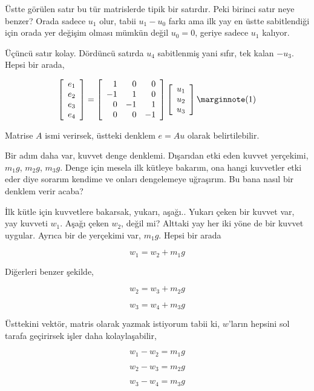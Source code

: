 \documentclass[12pt,fleqn]{article}\usepackage{../../common}
\begin{document}
Üstte görülen satır bu tür matrislerde tipik bir satırdır. Peki birinci
satır neye benzer? Orada sadece $u_1$ olur, tabii $u_1 - u_0$ farkı
ama ilk yay en üstte sabitlendiği için orada yer değişim olması mümkün
değil $u_0 = 0$, geriye sadece $u_1$ kalıyor.

Üçüncü satır kolay. Dördüncü satırda $u_4$ sabitlenmiş yani sıfır,
tek kalan $-u_3$. Hepsi bir arada,

$$
\left[\begin{array}{c}
e_1 \\ e_2 \\ e_3 \\ e_4
\end{array}\right] =
\left[\begin{array}{rrrr}
1 & 0 & 0 \\ -1 & 1 & 0 \\ 0 & -1 & 1 \\ 0 & 0 & -1
\end{array}\right]
\left[\begin{array}{c}
u_1 \\ u_2 \\ u_3 
\end{array}\right]
\mlabel{1}
$$

Matrise $A$ ismi verirsek, üstteki denklem $e = A u $ olarak belirtilebilir.

Bir adım daha var, kuvvet denge denklemi. Dışarıdan etki eden kuvvet yerçekimi,
$m_1 g$, $m_2 g$, $m_3 g$. Denge için mesela ilk kütleye bakarım, ona hangi
kuvvetler etki eder diye sorarım kendime ve onları dengelemeye uğraşırım.
Bu bana nasıl bir denklem verir acaba?

İlk kütle için kuvvetlere bakarsak, yukarı, aşağı.. Yukarı çeken bir kuvvet
var, yay kuvveti $w_1$. Aşağı çeken $w_2$, değil mi? Alttaki yay her iki
yöne de bir kuvvet uygular. Ayrıca bir de yerçekimi var, $m_1 g$. Hepsi bir
arada

$$
w_1 = w_2 + m_1 g
$$

Diğerleri benzer şekilde,

$$
w_2 = w_3 + m_2 g
$$

$$
w_3 = w_4 + m_3 g
$$

Üsttekini vektör, matris olarak yazmak istiyorum tabii ki, $w$'ların
hepsini sol tarafa geçirirsek işler daha kolaylaşabilir,


$$
w_1 - w_2 = m_1 g
$$

$$
w_2 - w_3 = m_2 g
$$

$$
w_3 - w_4 = m_3 g
$$
\end{document}
